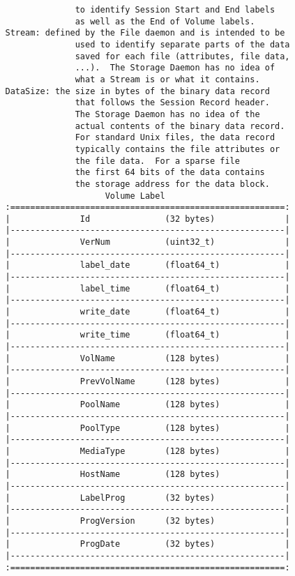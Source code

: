 \begin{verbatim}
                 to identify Session Start and End labels
                 as well as the End of Volume labels.
   Stream: defined by the File daemon and is intended to be
                 used to identify separate parts of the data
                 saved for each file (attributes, file data,
                 ...).  The Storage Daemon has no idea of
                 what a Stream is or what it contains.
   DataSize: the size in bytes of the binary data record
                 that follows the Session Record header.
                 The Storage Daemon has no idea of the
                 actual contents of the binary data record.
                 For standard Unix files, the data record
                 typically contains the file attributes or
                 the file data.  For a sparse file
                 the first 64 bits of the data contains
                 the storage address for the data block.
                       Volume Label
   :=======================================================:
   |              Id               (32 bytes)              |
   |-------------------------------------------------------|
   |              VerNum           (uint32_t)              |
   |-------------------------------------------------------|
   |              label_date       (float64_t)             |
   |-------------------------------------------------------|
   |              label_time       (float64_t)             |
   |-------------------------------------------------------|
   |              write_date       (float64_t)             |
   |-------------------------------------------------------|
   |              write_time       (float64_t)             |
   |-------------------------------------------------------|
   |              VolName          (128 bytes)             |
   |-------------------------------------------------------|
   |              PrevVolName      (128 bytes)             |
   |-------------------------------------------------------|
   |              PoolName         (128 bytes)             |
   |-------------------------------------------------------|
   |              PoolType         (128 bytes)             |
   |-------------------------------------------------------|
   |              MediaType        (128 bytes)             |
   |-------------------------------------------------------|
   |              HostName         (128 bytes)             |
   |-------------------------------------------------------|
   |              LabelProg        (32 bytes)              |
   |-------------------------------------------------------|
   |              ProgVersion      (32 bytes)              |
   |-------------------------------------------------------|
   |              ProgDate         (32 bytes)              |
   |-------------------------------------------------------|
   :=======================================================:


\end{verbatim}
